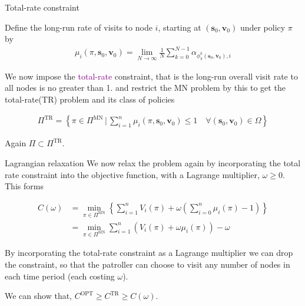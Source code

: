 \documentclass[10pt]{beamer}
\begin{document}
\begin{frame}{Total-rate constraint}
\begin{definition}
Define the long-run rate of visits to node $i$, starting at $(\bm{s}_{0},\bm{v}_{0})$ under policy $\pi$ by
\begin{align*}
\mu_{i}(\pi,\bm{s}_{0},\bm{v}_{0})=\lim\limits_{N \rightarrow \infty} \frac{1}{N} \sum\limits_{k=0}^{N-1} \alpha_{\phi_{\pi}^{k}(\bm{s}_{0},\bm{v}_{0}),i}
\end{align*}
\end{definition}

We now impose the \textcolor{purple}{total-rate} constraint, that is the long-run overall visit rate to all nodes is no greater than 1. and restrict the MN problem by this to get the total-rate(TR) problem and its class of policies

\begin{align*}
\Pi^{\text{TR}}=\left\{ \pi \in \Pi^{\text{MN}} \, \bigg| \, \sum\limits_{i=1}^{n} \mu_{i}(\pi,\bm{s}_{0},\bm{v}_{0}) \leq 1 \quad \forall (\bm{s}_{0},\bm{v}_{0}) \in \Omega \right\}
\end{align*}

Again $\Pi \subset \Pi^{\text{TR}}$.
\end{frame}

\begin{frame}{Lagrangian relaxation}
We now relax the problem again by incorporating the total rate constraint into the objective function, with a Lagrange multiplier, $\omega \geq 0$. This forms

\begin{align*}
C(\omega)&=\min_{\pi \in \Pi^{\text{MN}}} \left\{ \sum\limits_{i=1}^{n} V_{i}(\pi) + \omega \left( \sum\limits_{i=0}^{n} \mu_{i}(\pi) -1 \right) \right\} \\
&=\min_{\pi \in \Pi^{\text{MN}}} \sum\limits_{i=1}^{n} (V_{i}(\pi)+\omega \mu_{i}(\pi)) - \omega
\end{align*}

By incorporating the total-rate constraint as a Lagrange multiplier we can drop the constraint, so that the patroller can choose to visit any number of nodes in each time period (each costing $\omega$).

We can show that, $C^{\text{OPT}} \geq C^{\text{TR}} \geq C(\omega)$.
\end{frame}
\end{document}
